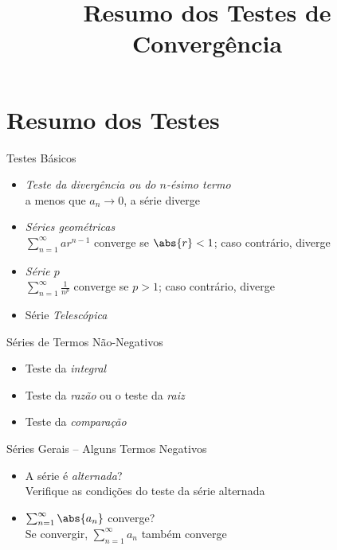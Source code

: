 \documentclass[fleqn,utf8,aspectratio=169,12pt]{beamer}
\title{Resumo dos Testes de Convergência}
\begin{document}
\addtitle

\section{Resumo dos Testes}

\begin{frame}{Testes Básicos}
	\begin{itemize}[<+->]
		\item \emph{Teste da divergência ou do $n$-ésimo termo}\\
          a menos que $a_n\to 0$, a série diverge \\[5mm]
		\item \emph{Séries geométricas} \\[3mm]
          \(\sum_{n=1}^{\infty} ar^{n-1}\) converge se \(\abs{r}<1\); caso contrário, diverge \\[5mm]
		\item \emph{Série $p$} \\[3mm]
          \(\sum_{n=1}^{\infty} \frac{1}{n^p}\)
          converge se $p>1$; caso contrário, diverge\\[5mm]
    \item Série \emph{Telescópica}
	\end{itemize}
\end{frame}

\begin{frame}{Séries de Termos Não-Negativos}
\begin{itemize}[<+->]
  \item Teste da \emph{integral} \\[5mm]
  \item Teste da \emph{razão} ou o teste da \emph{raiz} \\[5mm]
  \item Teste da \emph{comparação}
\end{itemize}
\end{frame}

\begin{frame}{Séries Gerais -- Alguns Termos Negativos}
	\begin{itemize}[<+->]
    \item A série é \emph{alternada}? \\[3mm]
          Verifique as condições do teste da série alternada \\[5mm]
		\item \(\sum_{n=1}^{\infty} \abs{a_n}\) converge? \\[3mm]
		      Se convergir, \(\sum_{n=1}^{\infty} a_n\) também converge
	\end{itemize}
\end{frame}

\end{document}
